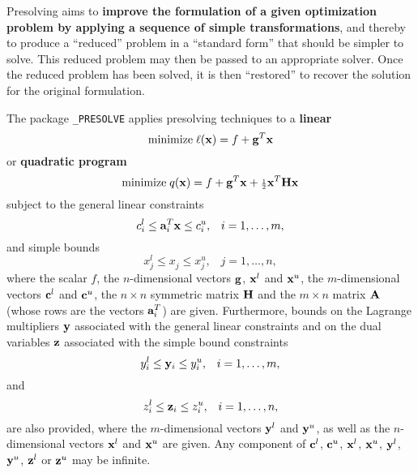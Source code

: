 \documentclass{galahad}
\newcommand{\packagename}{PRESOLVE}
\newcommand{\fullpackagename}{\libraryname\_\packagename}
\begin{document}
\galheader


\galsummary

Presolving aims to {\bf improve the formulation of a given optimization
  problem by applying a sequence of simple transformations}, and thereby
to produce a ``reduced'' problem in a ``standard form'' that should be
simpler to solve.  This reduced problem may then be passed to an
appropriate solver.  Once the reduced problem has been solved, it is
then ``restored'' to recover the solution for the original formulation.

The package {\tt \fullpackagename} applies presolving techniques to a
{\bf linear}
\begin{equation}\label{objlp}
{\rm minimize}\;  \ell({\mathbf{x}}) = f + {\mathbf{g}}^T {\mathbf{x}}
\end{equation}
or {\bf quadratic program}
\begin{equation}\label{objqp}
{\rm minimize}\;  q({\mathbf{x}}) = f + {\mathbf{g}}^T {\mathbf{x}} + {\scriptstyle \frac{1}{2}} {\mathbf{x}}^T {\mathbf{H}} {\mathbf{x}}
\end{equation}
subject to the general linear constraints
\begin{equation}\label{gcqp}
c_{i}^{l}  \leq  {\mathbf{a}}_{i}^{T}{\mathbf{x}}  \leq  c_{i}^{u}, \;\;\; i = 1, \ldots , m,
\end{equation}
and simple bounds
\begin{equation}\label{vbqp}
x_{j}^{l}  \leq  x_{j}^{ } \leq  x_{j}^{u} , \;\;\; j = 1, \ldots , n,
\end{equation}
where the scalar $f$, the $n$-dimensional vectors ${\mathbf{g}}$, ${\mathbf{x}}^l$ and
${\mathbf{x}}^u$, the $m$-dimensional vectors ${\mathbf{c}}^l$ and ${\mathbf{c}}^u$,
the $n \times n$ symmetric matrix ${\mathbf{H}}$ and the $m \times n$ matrix ${\mathbf{A}}$
(whose rows are the vectors ${\mathbf{a}}_{i}^T$) are
given. Furthermore, bounds on the Lagrange multipliers ${\mathbf{y}}$ associated with
the general linear constraints and on the dual variables ${\mathbf{z}}$ associated
with the simple bound constraints
\[
y_{i}^{l}  \leq  {\mathbf{y}}_{i}  \leq  y_{i}^{u}, \;\;\;  i = 1, \ldots , m,
\]
and
\[
z_{i}^{l}  \leq  {\mathbf{z}}_{i}  \leq  z_{i}^{u}, \;\;\;  i = 1, \ldots , n,
\]
are also provided, where the $m$-dimensional vectors ${\mathbf{y}}^l$ and
${\mathbf{y}}^u$, as well as the $n$-dimensional vectors ${\mathbf{x}}^l$ and ${\mathbf{x}}^u$
are given.  Any component of ${\mathbf{c}}^l$, ${\mathbf{c}}^u$, ${\mathbf{x}}^l$, ${\mathbf{x}}^u$,
${\mathbf{y}}^l$, ${\mathbf{y}}^u$, ${\mathbf{z}}^l$ or ${\mathbf{z}}^u$ may be infinite.

\end{document}
